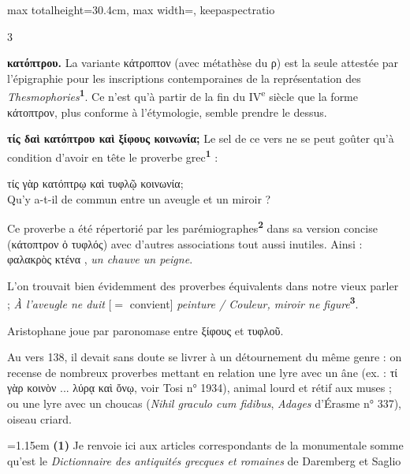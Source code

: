 \documentclass[11pt,twoside]{book}
\newcommand{\italique}[1]{\textit{#1}}
\newcommand{\citComm}[1]{\begin{quoting}[vskip=0.4pt,leftmargin=0.7em,rightmargin=0.2em]#1\end{quoting}}
\newcommand{\nieme}[1]{#1\textsuperscript{e}}
\newcommand{\latin}[1]{\textit{#1}}
\newcommand{\marqueur}[1]{\textsuperscript{\color{rubricRed}\textbf{#1}}}
\begin{document}
\begin{adjustbox}{max totalheight=30.4cm, max width=\textwidth, keepaspectratio}
\begin{minipage}{\textwidth}
{\begin{multicols}{3}
\par\vspace{1.5pt}
 \textbf{κατόπτρου.} La variante κάτροπτον (avec métathèse du ρ) est la seule attestée par l'épigraphie pour les inscriptions contemporaines de la représentation des \italique{Thesmophories}\marqueur{1}. Ce n'est qu'à partir de la fin du \nieme{IV} siècle que la forme κάτοπτρον, plus conforme à l'étymologie, semble prendre le dessus.
\par\vspace{1.5pt}
 \textbf{τίς δαὶ κατόπτρου καὶ ξίφους κοινωνία;} Le sel de ce vers ne se peut goûter qu'à condition d'avoir en tête le proverbe grec\marqueur{1} :
\citComm{τίς γὰρ κατόπτρῳ καὶ τυφλῷ κοινωνία;\\
Qu'y a-t-il de commun entre un aveugle et un miroir ?}
\par\vspace{1.5pt}
\noindent Ce proverbe a été répertorié par les parémiographes\marqueur{2} dans sa version concise (κάτοπτρον ὁ τυφλός) avec d'autres associations tout aussi inutiles. Ainsi : φαλακρὸς κτένα , \italique{un chauve un peigne}.
\par\vspace{1.5pt}
\noindent L'on trouvait bien évidemment des proverbes équivalents dans notre vieux parler ; \italique{À l'aveugle ne duit} [$=$ convient]\italique{ peinture / Couleur, miroir ne figure}\marqueur{3}.
\par\vspace{1.5pt}
\noindent Aristophane joue par paronomase entre ξίφους et τυφλοῦ.
\par\vspace{1.5pt}
\noindent Au vers 138, il devait sans doute se livrer à un détournement du même genre : on recense de nombreux proverbes mettant en relation une lyre avec un âne (ex. : τί γὰρ κοινὸν ... λύρᾳ καὶ ὄνῳ, voir Tosi n° 1934), animal lourd et rétif aux muses ; ou une lyre avec un choucas (\latin{Nihil graculo cum fidibus}, \italique{Adages} d'Érasme n° 337), oiseau criard.
\par\vspace{1.5pt}
\par\vspace{1.2pt}\par\nopagebreak\vspace{1pt}\noindent\hangindent=1.15em {\color{sepiaNote}\textbf{(1)}} Je renvoie ici aux articles correspondants de la monumentale somme qu'est le \italique{Dictionnaire des antiquités grecques et romaines} de Daremberg et Saglio

\end{multicols}}
\end{minipage}
\end{adjustbox}
\end{document}
